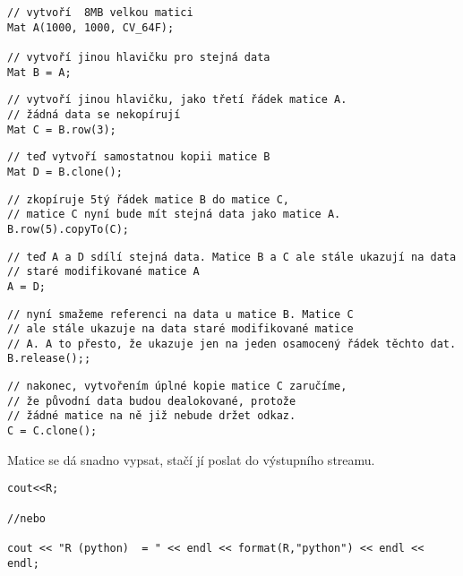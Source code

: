 \begin{Verbatim}
// vytvoří  8MB velkou matici
Mat A(1000, 1000, CV_64F);

// vytvoří jinou hlavičku pro stejná data
Mat B = A;
\end{Verbatim}


\begin{Verbatim}
// vytvoří jinou hlavičku, jako třetí řádek matice A.
// žádná data se nekopírují
Mat C = B.row(3);
\end{Verbatim}


\begin{Verbatim}
// teď vytvoří samostatnou kopii matice B
Mat D = B.clone();
\end{Verbatim}

\begin{Verbatim}
// zkopíruje 5tý řádek matice B do matice C,
// matice C nyní bude mít stejná data jako matice A.
B.row(5).copyTo(C);
\end{Verbatim}


\begin{Verbatim}
// teď A a D sdílí stejná data. Matice B a C ale stále ukazují na data
// staré modifikované matice A
A = D;
\end{Verbatim}


\begin{Verbatim}
// nyní smažeme referenci na data u matice B. Matice C
// ale stále ukazuje na data staré modifikované matice
// A. A to přesto, že ukazuje jen na jeden osamocený řádek těchto dat.
B.release();;
\end{Verbatim}


\begin{Verbatim}
// nakonec, vytvořením úplné kopie matice C zaručíme,
// že původní data budou dealokované, protože
// žádné matice na ně již nebude držet odkaz.
C = C.clone();
\end{Verbatim}
 

Matice se dá snadno vypsat, stačí jí poslat do výstupního streamu.

\begin{Verbatim}
cout<<R;

//nebo

cout << "R (python)  = " << endl << format(R,"python") << endl << endl;
\end{Verbatim}

